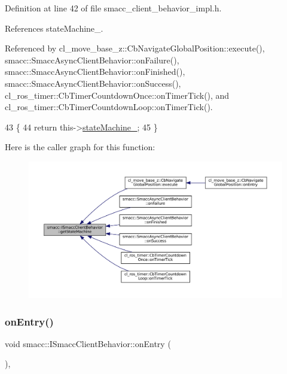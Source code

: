 Definition at line 42 of file smacc\+\_\+client\+\_\+behavior\+\_\+impl.\+h.



References state\+Machine\+\_\+.



Referenced by cl\+\_\+move\+\_\+base\+\_\+z\+::\+Cb\+Navigate\+Global\+Position\+::execute(), smacc\+::\+Smacc\+Async\+Client\+Behavior\+::on\+Failure(), smacc\+::\+Smacc\+Async\+Client\+Behavior\+::on\+Finished(), smacc\+::\+Smacc\+Async\+Client\+Behavior\+::on\+Success(), cl\+\_\+ros\+\_\+timer\+::\+Cb\+Timer\+Countdown\+Once\+::on\+Timer\+Tick(), and cl\+\_\+ros\+\_\+timer\+::\+Cb\+Timer\+Countdown\+Loop\+::on\+Timer\+Tick().


\begin{DoxyCode}
43 \{
44     \textcolor{keywordflow}{return} this->\hyperlink{classsmacc_1_1ISmaccClientBehavior_a0fea65db292a8bb3dfba3e5840491d79}{stateMachine\_};
45 \}
\end{DoxyCode}
Here is the caller graph for this function\+:
\nopagebreak
\begin{figure}[H]
\begin{center}
\leavevmode
\includegraphics[width=350pt]{classsmacc_1_1ISmaccClientBehavior_a9d55a85bf0a920033805a3c050de2019_icgraph}
\end{center}
\end{figure}
\mbox{\label{classsmacc_1_1ISmaccClientBehavior_a9877684b1954429719826e2d0924d980}} 
\subsubsection{\texorpdfstring{on\+Entry()}{onEntry()}}
{\footnotesize\ttfamily void smacc\+::\+I\+Smacc\+Client\+Behavior\+::on\+Entry (\begin{DoxyParamCaption}{ }\end{DoxyParamCaption})\hspace{0.3cm}{\ttfamily [protected]}, {\ttfamily [virtual]}}



